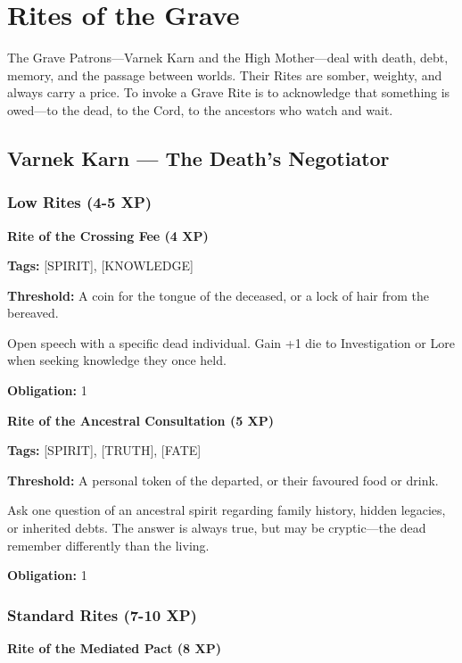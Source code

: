 \section{Rites of the Grave}

The Grave Patrons—Varnek Karn and the High Mother—deal with death, debt, memory, and the passage between worlds. Their Rites are somber, weighty, and always carry a price. To invoke a Grave Rite is to acknowledge that something is owed—to the dead, to the Cord, to the ancestors who watch and wait.

\subsection{Varnek Karn — The Death's Negotiator}

\subsubsection{Low Rites (4-5 XP)}

\textbf{Rite of the Crossing Fee (4 XP)}

\textbf{Tags:} [SPIRIT], [KNOWLEDGE]

\textbf{Threshold:} A coin for the tongue of the deceased, or a lock of hair from the bereaved.

Open speech with a specific dead individual. Gain +1 die to Investigation or Lore when seeking knowledge they once held.

\textbf{Obligation:} 1

\vspace{0.5em}

\textbf{Rite of the Ancestral Consultation (5 XP)}

\textbf{Tags:} [SPIRIT], [TRUTH], [FATE]

\textbf{Threshold:} A personal token of the departed, or their favoured food or drink.

Ask one question of an ancestral spirit regarding family history, hidden legacies, or inherited debts. The answer is always true, but may be cryptic—the dead remember differently than the living.

\textbf{Obligation:} 1

\subsubsection{Standard Rites (7-10 XP)}

\textbf{Rite of the Mediated Pact (8 XP)}

